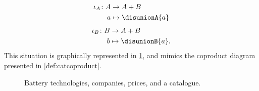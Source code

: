 \begin{example}
\begin{equation}
    \begin{aligned}
      \iota_A\colon A&\to A+B\\
      a&\mapsto \disunionA{a}
    \end{aligned}
  \end{equation}
  \begin{equation}\label{eq:exa-batt-inclusion-2}
    \begin{aligned}
      \iota_B\colon B&\to A+B\\
      b&\mapsto \disunionB{a}.
    \end{aligned}
  \end{equation}
  This situation is graphically represented in \cref{fig:coprod_batteries_1}, and mimics the coproduct diagram presented in \cref{def:catcoproduct}.

  \begin{figure}[h!]
    \centering
    \caption{Battery technologies, companies, prices, and a catalogue.}
    \label{fig:coprod_batteries_1}
  \end{figure}



\end{example}
